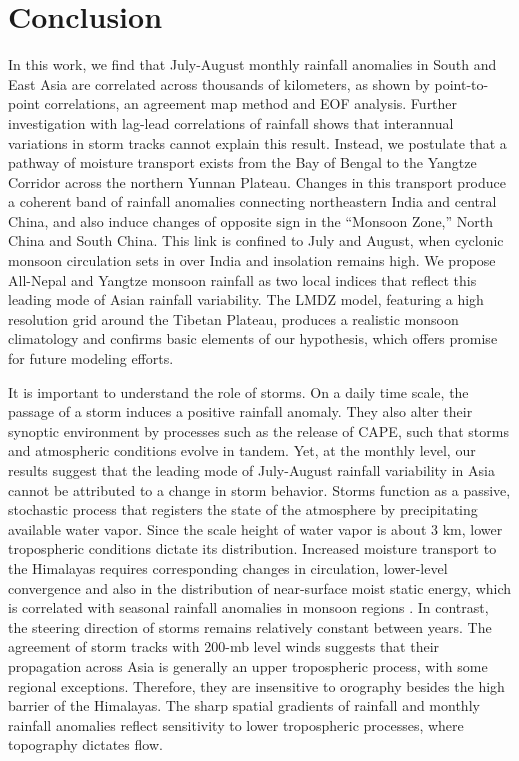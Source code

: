 \section{Conclusion}

	In this work, we find that July-August monthly rainfall anomalies in South and East Asia are correlated across thousands of kilometers, as shown by point-to-point correlations, an agreement map method and EOF analysis. Further investigation with lag-lead correlations of rainfall shows that interannual variations in storm tracks cannot explain this result. Instead, we postulate that a pathway of moisture transport exists from the Bay of Bengal to the Yangtze Corridor across the northern Yunnan Plateau. Changes in this transport produce a coherent band of rainfall anomalies connecting northeastern India and central China, and also induce changes of opposite sign in the ``Monsoon Zone,'' North China and South China. This link is confined to July and August, when cyclonic monsoon circulation sets in over India and insolation remains high. We propose All-Nepal and Yangtze monsoon rainfall as two local indices that reflect this leading mode of Asian rainfall variability. The LMDZ model, featuring a high resolution grid around the Tibetan Plateau, produces a realistic monsoon climatology and confirms basic elements of our hypothesis, which offers promise for future modeling efforts.
	
	It is important to understand the role of storms. On a daily time scale, the passage of a storm induces a positive rainfall anomaly. They also alter their synoptic environment by processes such as the release of CAPE, such that storms and atmospheric conditions evolve in tandem. Yet, at the monthly level, our results suggest that the leading mode of July-August rainfall variability in Asia cannot be attributed to a change in storm behavior. Storms function as a passive, stochastic process that registers the state of the atmosphere by precipitating available water vapor. Since the scale height of water vapor is about 3 km, lower tropospheric conditions dictate its distribution. Increased moisture transport to the Himalayas requires corresponding changes in circulation, lower-level convergence and also in the distribution of near-surface moist static energy, which is correlated with seasonal rainfall anomalies in monsoon regions \citep{Hurley2013}. In contrast, the steering direction of storms remains relatively constant between years. The agreement of storm tracks with 200-mb level winds suggests that their propagation across Asia is generally an upper tropospheric process, with some regional exceptions. Therefore, they are insensitive to orography besides the high barrier of the Himalayas. The sharp spatial gradients of rainfall and monthly rainfall anomalies reflect sensitivity to lower tropospheric processes, where topography dictates flow. 
		
